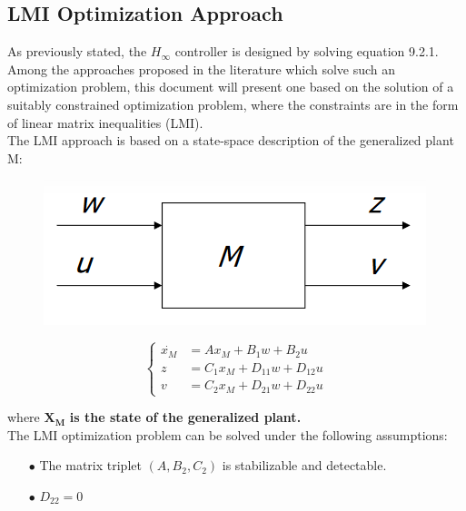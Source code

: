 \documentclass[a4paper,10pt,titlepage]{article}
\numberwithin{equation}{subsection}
\begin{document}
	\subsection{LMI Optimization Approach}
	As previously stated, the $H_\infty$ controller is designed by solving equation 9.2.1.\\
	\vspace{2pt}
	Among the approaches proposed in the literature which solve such an optimization problem, this document will present one based on the solution of a suitably constrained optimization problem, where the constraints are in the form of linear matrix inequalities (LMI).\\
	\vspace{2pt}
	The LMI approach is based on a state-space description of the generalized plant M:
	
	\begin{figure}[H]
		\begin{minipage}{0.3\textwidth}
			\centering
			\includegraphics[width=\linewidth]{images/generalized_plant_small.png}
			\label{fig:image13}
		\end{minipage}
		\centering
		\begin{minipage}{0.5\textwidth}
			\vspace{-20pt}
			\begin{equation}
				\left\{
				\begin{aligned}
					\dot{x_M} &= Ax_M + B_1w + B_2u \\
					z &= C_1x_M + D_{11}w + D_{12}u \\
					v &= C_2x_M + D_{21}w + D_{22}u
				\end{aligned}
				\right.
			\end{equation}
		\end{minipage}
	\end{figure}
	where $\bm{X_M}$ \textbf{is the state of the generalized plant.} \\
	\vspace{2pt}
	The LMI optimization problem can be solved under the following assumptions:
	\begin{enumerate}
		\item[$\bullet$] The matrix triplet $(A,B_2,C_2)$ is stabilizable and detectable.
		\item[$\bullet$] $D_{22} = 0$ 
	\end{enumerate}
	
\end{document}
